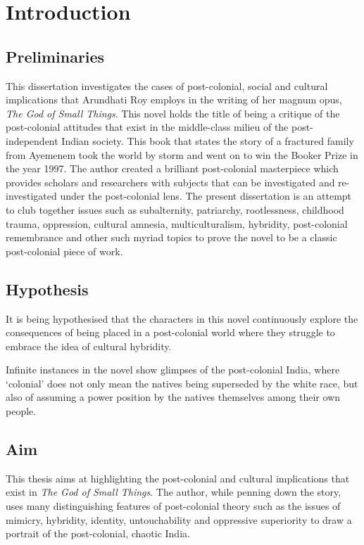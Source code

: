 \chapter{Introduction}

\section{Preliminaries}

This dissertation investigates the cases of post-colonial, social and cultural implications that Arundhati Roy employs in the writing of her magnum opus, \emph{The God of Small Things}. This novel holds the title of being a critique of the post-colonial attitudes that exist in the middle-class milieu of the post-independent Indian society. This book that states the story of a fractured family from Ayemenem took the world by storm and went on to win the Booker Prize in the year 1997. The author created a brilliant post-colonial masterpiece which provides scholars and researchers with subjects that can be investigated and re-investigated under the post-colonial lens. The present dissertation is an attempt to club together issues such as subalternity, patriarchy, rootlessness, childhood trauma, oppression, cultural amnesia, multiculturalism, hybridity, post-colonial remembrance and other such myriad topics to prove the novel to be a classic post-colonial piece of work.

\section{Hypothesis}

It is being hypothesised that the characters in this novel continuously explore the consequences of being placed in a post-colonial world where they struggle to embrace the idea of cultural hybridity.

Infinite instances in the novel show glimpses of the post-colonial India, where ‘colonial’ does not only mean the natives being superseded by the white race, but also of assuming a power position by the natives themselves among their own people. 

\section{Aim}

This thesis aims at highlighting the post-colonial and cultural implications that exist in \emph{The God of Small Things}. The author, while penning down the story, uses many distinguishing features of post-colonial theory such as the issues of mimicry, hybridity, identity, untouchability and oppressive superiority to draw a portrait of the post-colonial, chaotic India.

